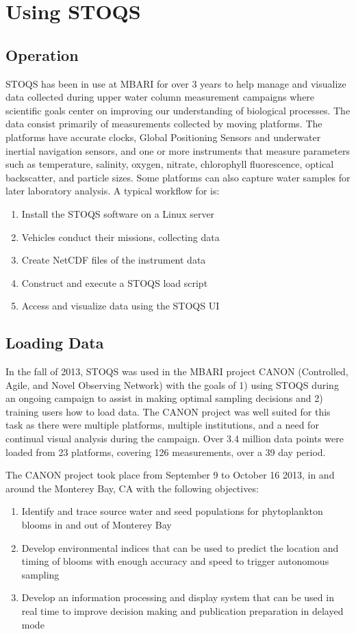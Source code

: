 \documentclass[conference]{IEEEtran}
\begin{document}
\section{Using STOQS}

\subsection{Operation}

STOQS has been in use at MBARI for over 3 years to help manage and visualize data collected during upper water column measurement campaigns where scientific goals center on improving our understanding of biological processes. The data consist primarily of measurements collected by moving platforms. The platforms have accurate clocks, Global Positioning Sensors and underwater inertial navigation sensors, and one or more instruments that measure parameters such as temperature, salinity, oxygen, nitrate, chlorophyll fluorescence, optical backscatter, and particle sizes. Some platforms can also capture water samples for later laboratory analysis. A typical workflow for is:
\begin{enumerate}
\item Install the STOQS software on a Linux server
\item Vehicles conduct their missions, collecting data
\item Create NetCDF files of the instrument data
\item Construct and execute a STOQS load script
\item Access and visualize data using the STOQS UI
\end{enumerate}


\subsection{Loading Data}

In the fall of 2013, STOQS was used in the MBARI project CANON (Controlled, Agile, and Novel Observing Network) with the goals of 1) using STOQS during an ongoing campaign to assist in making optimal sampling decisions and 2) training users how to load data.  The CANON project was well suited for this task as there were multiple platforms, multiple institutions, and a need for continual visual analysis during the campaign.  Over 3.4 million data points were loaded from 23 platforms, covering 126 measurements, over a 39 day period. 

The CANON project took place from September 9 to October 16 2013, in and around the Monterey Bay, CA with the following objectives: 
\begin{enumerate}
\item Identify and trace source water and seed populations for phytoplankton blooms in and out of Monterey Bay
\item Develop environmental indices that can be used to predict the location and timing of blooms with enough accuracy and speed to trigger autonomous sampling
\item Develop an information processing and display system that can be used in real time to improve decision making and publication preparation in delayed mode
\end{enumerate}
\end{document}
